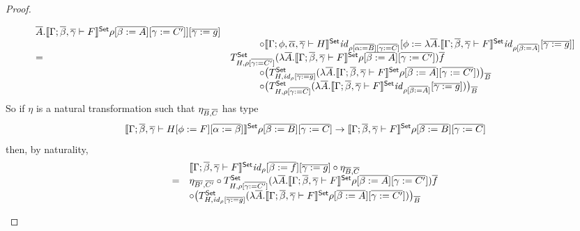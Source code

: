 \documentclass[acmsmall,review,anonymous]{acmart}
\theoremstyle{definition}
\newcommand{\set}{\mathsf{Set}}
\renewcommand{\id}{\mathit{id}}
\begin{document}
\begin{proof}
\begin{itemize}
\[\begin{array}{ll}
{    \ol{A}. \setsem{\Gamma; \ol{\beta}, \ol{\gamma} \vdash F} \rho
       [\ol{\beta := A}] [\ol{\gamma := C'}]]} [\ol{\gamma := g}] \\
&\hspace{3em} \circ \setsem{\Gamma; \phi, \ol{\alpha}, \ol{\gamma}
  \vdash H} \id_{\rho [\ol{\alpha := B}] [\ol{\gamma := C}]} [\phi :=
  \lambda \ol{A}. \setsem{\Gamma; \ol{\beta}, \ol{\gamma} \vdash F}
  \id_{\rho [\ol{\beta := A}]} [\ol{\gamma := g}]] \\
= & T^{\set}_{H,\rho [\ol{\gamma := C'}]} (\lambda
\ol{A}. \setsem{\Gamma; \ol{\beta}, \ol{\gamma} \vdash F} \rho
   [\ol{\beta := A}] [\ol{\gamma := C'}]) \ol{f} \\
&\hspace{3em} \circ \big( T^{\set}_{H,\id_{\rho}[\ol{\gamma := g}]}
   (\lambda \ol{A}. \setsem{\Gamma; \ol{\beta}, \ol{\gamma} \vdash F}
   \rho [\ol{\beta := A}] [\ol{\gamma := C'}]) \big)_{\ol{B}} \\
&\hspace{3em} \circ \big( T^{\set}_{H,\rho [\ol{\gamma := C}]} (\lambda
   \ol{A}. \setsem{\Gamma; \ol{\beta}, \ol{\gamma} \vdash F} \id_{\rho
     [\ol{\beta := A}]} [\ol{\gamma := g}]) \big)_{\ol{B}}
\end{array}\]
So if $\eta$ is a natural transformation such that $\eta_{\overline{B}, \overline{C}}$ has type
\[
\setsem{\Gamma; \ol{\beta},
  \ol{\gamma} \vdash H[\phi := F][\ol{\alpha := \beta}]}\rho
[\ol{\beta := B}] [\ol{\gamma := C}]
\to
\setsem{\Gamma; \ol{\beta},
   \ol{\gamma} \vdash F}\rho [\ol{\beta := B}] [\ol{\gamma := C}]\]
then, by naturality,
\[\begin{array}{ll}
 & \setsem{\Gamma; \ol{\beta}, \ol{\gamma} \vdash F} \id_{\rho}
       [\ol{\beta := f}] [\ol{\gamma := g}] \circ \eta_{\ol{B},
         \ol{C}} \\ 
= & \eta_{\ol{B'}, \ol{C'}} \circ T^{\set}_{H,\rho [\ol{\gamma := C'}]}
(\lambda \ol{A}. \setsem{\Gamma; \ol{\beta}, \ol{\gamma} \vdash F}
\rho [\ol{\beta := A}] [\ol{\gamma := C'}]) \ol{f} \\
& \circ \big( T^{\set}_{H,\id_{\rho}[\ol{\gamma := g}]} (\lambda
\ol{A}. \setsem{\Gamma; \ol{\beta}, \ol{\gamma} \vdash F} \rho
   [\ol{\beta := A}] [\ol{\gamma := C'}]) \big)_{\ol{B}} \\

\end{array}\]
\end{itemize}
\end{proof}
\end{document}
